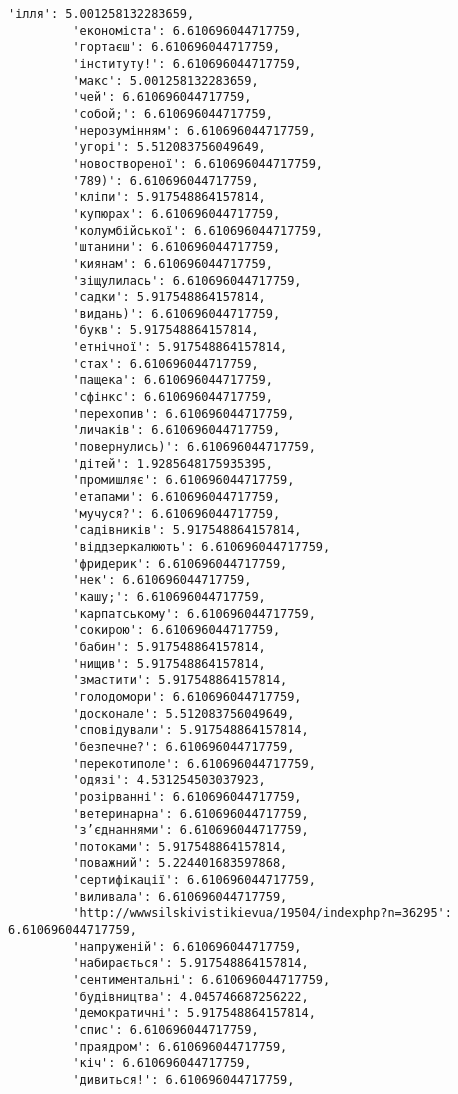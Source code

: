 \documentclass[11pt]{article}
\begin{document}
\begin{Verbatim}[commandchars=\\\{\}]
         'ілля': 5.001258132283659,
         'економіста': 6.610696044717759,
         'гортаєш': 6.610696044717759,
         'інституту!': 6.610696044717759,
         'макс': 5.001258132283659,
         'чей': 6.610696044717759,
         'собой;': 6.610696044717759,
         'нерозумінням': 6.610696044717759,
         'угорі': 5.512083756049649,
         'новоствореної': 6.610696044717759,
         '789)': 6.610696044717759,
         'кліпи': 5.917548864157814,
         'купюрах': 6.610696044717759,
         'колумбійської': 6.610696044717759,
         'штанини': 6.610696044717759,
         'киянам': 6.610696044717759,
         'зіщулилась': 6.610696044717759,
         'садки': 5.917548864157814,
         'видань)': 6.610696044717759,
         'букв': 5.917548864157814,
         'етнічної': 5.917548864157814,
         'стах': 6.610696044717759,
         'пащека': 6.610696044717759,
         'сфінкс': 6.610696044717759,
         'перехопив': 6.610696044717759,
         'личаків': 6.610696044717759,
         'повернулись)': 6.610696044717759,
         'дітей': 1.9285648175935395,
         'промишляє': 6.610696044717759,
         'етапами': 6.610696044717759,
         'мучуся?': 6.610696044717759,
         'садівників': 5.917548864157814,
         'віддзеркалюють': 6.610696044717759,
         'фридерик': 6.610696044717759,
         'нек': 6.610696044717759,
         'кашу;': 6.610696044717759,
         'карпатському': 6.610696044717759,
         'сокирою': 6.610696044717759,
         'бабин': 5.917548864157814,
         'нищив': 5.917548864157814,
         'змастити': 5.917548864157814,
         'голодомори': 6.610696044717759,
         'досконале': 5.512083756049649,
         'сповідували': 5.917548864157814,
         'безпечне?': 6.610696044717759,
         'перекотиполе': 6.610696044717759,
         'одязі': 4.531254503037923,
         'розірванні': 6.610696044717759,
         'ветеринарна': 6.610696044717759,
         'з’єднаннями': 6.610696044717759,
         'потоками': 5.917548864157814,
         'поважний': 5.224401683597868,
         'сертифікації': 6.610696044717759,
         'виливала': 6.610696044717759,
         'http://wwwsilskivistikievua/19504/indexphp?n=36295': 6.610696044717759,
         'напруженій': 6.610696044717759,
         'набирається': 5.917548864157814,
         'сентиментальні': 6.610696044717759,
         'будівництва': 4.045746687256222,
         'демократичні': 5.917548864157814,
         'спис': 6.610696044717759,
         'праядром': 6.610696044717759,
         'кіч': 6.610696044717759,
         'дивиться!': 6.610696044717759,

\end{Verbatim}
\end{document}

